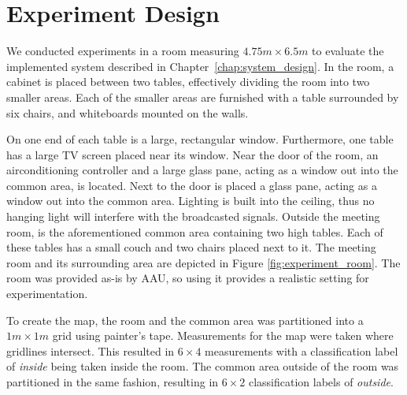 \section{Experiment Design}\label{sec:experiment_design}
We conducted experiments in a room measuring $4.75m \times 6.5m$ to evaluate the implemented system described in Chapter~\ref{chap:system_design}.
In the room, a cabinet is placed between two tables, effectively dividing the room into two smaller areas. 
Each of the smaller areas are furnished with a table surrounded by six chairs, and whiteboards mounted on the walls.

On one end of each table is a large, rectangular window.
Furthermore, one table has a large TV screen placed near its window. 
Near the door of the room, an airconditioning controller and a large glass pane, acting as a window out into the common area, is located. 
Next to the door is placed a glass pane, acting as a window out into the common area. 
Lighting is built into the ceiling, thus no hanging light will interfere with the broadcasted signals. 
Outside the meeting room, is the aforementioned common area containing two high tables.
Each of these tables has a small couch and two chairs placed next to it.
The meeting room and its surrounding area are depicted in Figure \ref{fig:experiment_room}.
The room was provided as-is by AAU, so using it provides a realistic setting for experimentation.

To create the map, the room and the common area was partitioned into a $1m \times 1m$ grid using painter's tape.
Measurements for the map were taken where gridlines intersect.
This resulted in $6 \times 4$ measurements with a classification label of \textit{inside} being taken inside the room.
The common area outside of the room was partitioned in the same fashion, resulting in  $6 \times 2$ classification labels of \textit{outside}. 


